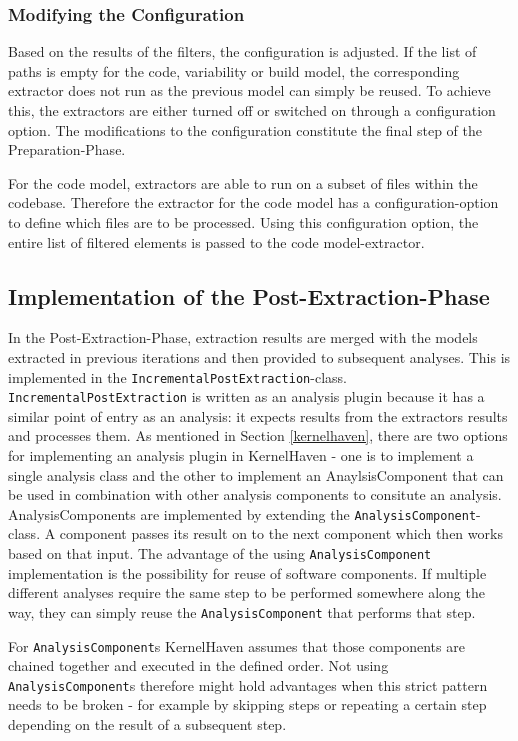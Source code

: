 \documentclass[a4paper]{article}
\begin{document}
\subsubsection{Modifying the Configuration}

Based on the results of the filters, the configuration is adjusted. If the list of paths is empty for the code, variability or build model, the corresponding extractor does not run as the previous model can simply be reused. To achieve this, the extractors are either turned off or switched on through a configuration option. The modifications to the configuration constitute the final step of the Preparation-Phase.

For the code model, extractors are able to run on a subset of files within the codebase. Therefore the extractor for the code model has a configuration-option to define which files are to be processed. Using this configuration option, the entire list of filtered elements is passed to the code model-extractor.


\subsection{Implementation of the Post-Extraction-Phase}\label{post-extraction-phase}

In the Post-Extraction-Phase, extraction results are merged with the models extracted in previous iterations and then provided to subsequent analyses. This is implemented in the \texttt{Incremental\-Post\-Extraction}-class. 
\texttt{Incremental\-Post\-Extraction} is written as an analysis plugin because it has a similar point of entry as an analysis: it expects results from the extractors results and processes them. As mentioned in Section \ref{kernelhaven}, there are two options for implementing an analysis plugin in KernelHaven - one is to implement a single analysis class and the other to implement an AnaylsisComponent that can be used in combination with other analysis components to consitute an analysis. AnalysisComponents are implemented by extending the \texttt{Analysis\-Component}-class. A component passes its result on to the next component which then works based on that input. The advantage of the using \texttt{Analysis\-Component} implementation is the possibility for reuse of software components. If multiple different analyses require the same step to be performed somewhere along the way, they can simply reuse the \texttt{Analysis\-Component} that performs that step.

For \texttt{Analysis\-Component}s KernelHaven assumes that those components are chained together and executed in the defined order. Not using \texttt{Analysis\-Component}s therefore might hold advantages when this strict pattern needs to be broken - for example by skipping steps or repeating a certain step depending on the result of a subsequent step.
\end{document}
